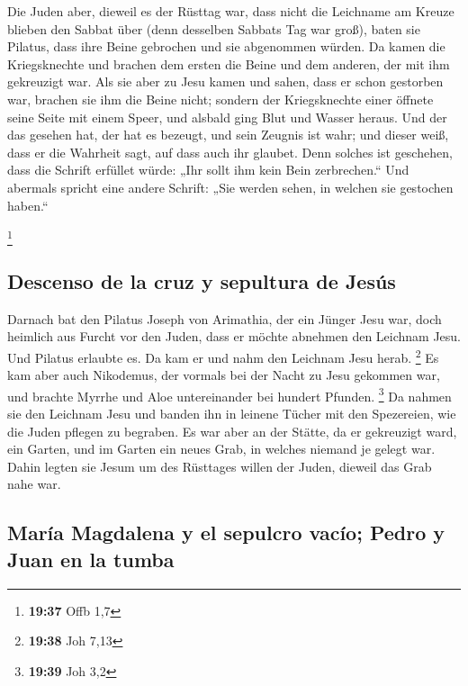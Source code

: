  Die Juden aber, dieweil es der Rüsttag war, dass nicht
die Leichname am Kreuze blieben den Sabbat über (denn desselben Sabbats
Tag war groß), baten sie Pilatus, dass ihre Beine gebrochen und sie
abgenommen würden.  Da kamen die Kriegsknechte und
brachen dem ersten die Beine und dem anderen, der mit ihm gekreuzigt
war.  Als sie aber zu Jesu kamen und sahen, dass er schon
gestorben war, brachen sie ihm die Beine nicht;  sondern
der Kriegsknechte einer öffnete seine Seite mit einem Speer, und alsbald
ging Blut und Wasser heraus.  Und der das gesehen hat,
der hat es bezeugt, und sein Zeugnis ist wahr; und dieser weiß, dass er
die Wahrheit sagt, auf dass auch ihr glaubet.  Denn
solches ist geschehen, dass die Schrift erfüllet würde: „Ihr sollt ihm
kein Bein zerbrechen.``  Und abermals spricht eine andere
Schrift: „Sie werden sehen, in welchen sie gestochen haben.``

\footnote{\textbf{19:37} Offb 1,7}

\hypertarget{descenso-de-la-cruz-y-sepultura-de-jesuxfas}{%
\subsection{Descenso de la cruz y sepultura de
Jesús}\label{descenso-de-la-cruz-y-sepultura-de-jesuxfas}}

 Darnach bat den Pilatus Joseph von Arimathia, der ein
Jünger Jesu war, doch heimlich aus Furcht vor den Juden, dass er möchte
abnehmen den Leichnam Jesu. Und Pilatus erlaubte es. Da kam er und nahm
den Leichnam Jesu herab. \footnote{\textbf{19:38} Joh 7,13}
 Es kam aber auch Nikodemus, der vormals bei der Nacht zu
Jesu gekommen war, und brachte Myrrhe und Aloe untereinander bei hundert
Pfunden. \footnote{\textbf{19:39} Joh 3,2}  Da nahmen sie
den Leichnam Jesu und banden ihn in leinene Tücher mit den Spezereien,
wie die Juden pflegen zu begraben.  Es war aber an der
Stätte, da er gekreuzigt ward, ein Garten, und im Garten ein neues Grab,
in welches niemand je gelegt war.  Dahin legten sie Jesum
um des Rüsttages willen der Juden, dieweil das Grab nahe war.

\hypertarget{maruxeda-magdalena-y-el-sepulcro-vacuxedo-pedro-y-juan-en-la-tumba}{%
\subsection{María Magdalena y el sepulcro vacío; Pedro y Juan en la
tumba}\label{maruxeda-magdalena-y-el-sepulcro-vacuxedo-pedro-y-juan-en-la-tumba}}


